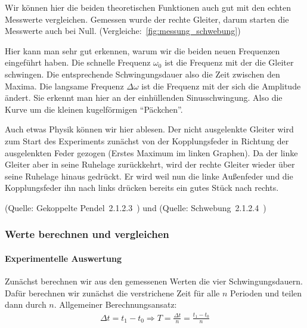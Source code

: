 \documentclass{article}
\begin{document}
                  Wir können hier die beiden theoretischen Funktionen auch gut mit den echten Messwerte vergleichen.
                  Gemessen wurde der rechte Gleiter, darum starten die Messwerte auch bei Null. (Vergleiche:~\ref{fig:messung_schwebung})

                  Hier kann man sehr gut erkennen, warum wir die beiden neuen Frequenzen eingeführt haben.
                  Die schnelle Frequenz \(\omega_0\) ist die Frequenz mit der die Gleiter schwingen. Die entsprechende Schwingungsdauer also die Zeit zwischen den Maxima.
                  Die langsame Frequenz \(\Delta \omega \) ist die Frequenz mit der sich die Amplitude ändert. Sie erkennt man hier an der einhüllenden Sinusschwingung.
                  Also die Kurve um die kleinen kugelförmigen \enquote{Päckchen}.

                  Auch etwas Physik können wir hier ablesen.
                  Der nicht ausgelenkte Gleiter wird zum Start des Experiments zunächst von der Kopplungsfeder in Richtung der ausgelenkten Feder gezogen (Erstes Maximum im linken Graphen).
                  Da der linke Gleiter aber in seine Ruhelage zurückkehrt, wird der rechte Gleiter wieder über seine Ruhelage hinaus gedrückt.
                  Er wird weil nun die linke Außenfeder und die Kopplungsfeder ihn nach links drücken bereits ein gutes Stück nach rechts.

                  (Quelle: Gekoppelte Pendel~2.1.2.3~\cite{AnleitungPraktikum}) und
                  (Quelle: Schwebung~2.1.2.4~\cite{AnleitungPraktikum})

          \subsubsection{Werte berechnen und vergleichen}

              \paragraph{Experimentelle Auswertung}
                  Zunächst berechnen wir aus den gemessenen Werten die vier Schwingungsdauern.
                  Dafür berechnen wir zunächst die verstrichene Zeit für alle \(n\) Perioden und teilen dann durch \(n\).
                  Allgemeiner Berechnungsansatz:
                  \begin{equation}
                      \begin{gathered}
                          \Delta t = t_1 - t_0 \Rightarrow T = \frac{\Delta t}{n} = \frac{t_1 - t_0}{n}
                      \end{gathered}
                  \end{equation}
\end{document}

